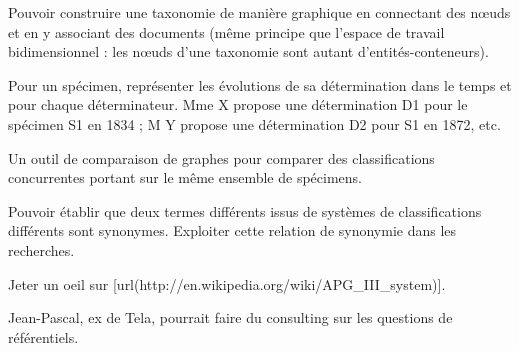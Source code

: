 \startchapter[title={Outils de classification}]

\startTODO
\startitemize
	\item Pouvoir construire une taxonomie de manière graphique en connectant des nœuds et en y associant des documents (même principe que l'espace de travail bidimensionnel : les nœuds d'une taxonomie sont autant d'entités-conteneurs).
	\item Pour un spécimen, représenter les évolutions de sa détermination dans le temps et pour chaque déterminateur. Mme X propose une détermination D1 pour le spécimen S1 en 1834 ; M Y propose une détermination D2 pour S1 en 1872, etc.
	\item Un outil de comparaison de graphes pour comparer des classifications concurrentes portant sur le même ensemble de spécimens.
	\item Pouvoir établir que deux termes différents issus de systèmes de classifications différents sont synonymes. Exploiter cette relation de synonymie dans les recherches.
	\item Jeter un oeil sur [url(http://en.wikipedia.org/wiki/APG_III_system)].
	\item Jean-Pascal, ex de Tela, pourrait faire du consulting sur les questions de référentiels.
\stopitemize
\stopTODO
